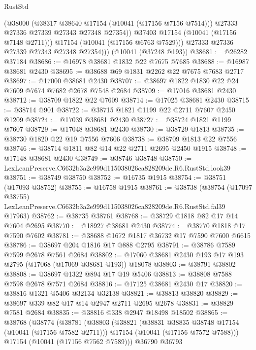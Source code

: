 \begin{lexlean}{RustStd}
\begin{coremodule}
                (@38000
                  (@38317 @38640 @17154 (@10041 (@17156 @7156 @7514)))
                  @27333
                  @27336
                  @27339
                  @27343
                  @27348
                  @27354))
              @37403
              @17154
              (@10041 (@17156 @7148 @2711)))
            @17154
            (@10041 (@17156 @6763 @7529)))
          @27333
          @27336
          @27339
          @27343
          @27348
          @27354)))
    (@10041 (@37248 @193))
@38681 := @26282 @37184
@38686 := @16978 @38681 @1832 @22 @7675 @7685
@38688 := @16987 @38681 @2430
@38695 := @38688 @69 @1831 @2262 @22 @7675 @7683 @2717
@38697 := @17000 @38681 @2430
@38707 := @38697 @1822 @1830 @22 @24 @7609 @7674 @7682 @2678 @7548 @2684
@38709 := @17016 @38681 @2430
@38712 := @38709 @1822 @22 @7609
@38714 := @17025 @38681 @2430
@38715 := @38714 @901
@38722 := @38715 @1821 @1199 @22 @2711 @7607 @2450 @1209
@38724 := @17039 @38681 @2430
@38727 := @38724 @1821 @1199 @7607
@38729 := @17048 @38681 @2430
@38730 := @38729 @1813
@38735 := @38730 @1820 @22 @19 @7556 @7606
@38738 := @38709 @1813 @22 @7556
@38746 := @38714 @1811 @82 @14 @22 @2711 @2695 @2450 @1915
@38748 := @17148 @38681 @2430
@38749 := @38746 @38748
@38750 := LexLeanPreserve.C6632b3a2e999d115038026ca828209de.R6.RustStd.look39
@38751 := @38749 @38750
@38752 := @16735 @1915
@38754 := @38751 (@17093 @38752)
@38755 := @16758 @1915
@38761 := @38738
    (@38754
      (@17097 @38755)
      LexLeanPreserve.C6632b3a2e999d115038026ca828209de.R6.RustStd.fal39
      @17963)
@38762 := @38735 @38761
@38768 := @38729 @1818 @82 @17 @14 @7604 @2695
@38770 := @18927 @38681 @2430
@38774 := @38770 @1818 @17 @7590 @7602
@38781 := @38688 @1672 @1817 @36732 @17 @7590 @7600 @6615
@38786 := @38697 @204 @1816 @17 @888 @2795
@38791 := @38786 @7589 @7599 @2678 @7561 @2684
@38802 := @17060 @38681 @2430 @193 @17 @193 @2795 (@17068 (@17069 @38681 @193)) @18078
@38803 := @38791 @38802
@38808 := @38697 @1322 @894 @17 @19 @5406
@38813 := @38808 @7588 @7598 @2678 @7571 @2684
@38816 := @17125 @38681 @2430 @17
@38820 := @38816 @1321 @5406 @32134 @32138
@38821 := @38813 @38820
@38829 := @38697 @339 @82 @17 @14 @2947 @2711 @2695 @2678
@38831 := @38829 @7581 @2684
@38835 := @38816 @338 @2947 @18498 @18502
@38865 := @38768
    (@38774
      (@38781
        (@38803
          (@38821
            (@38831 @38835 @38748 @17154 (@10041 (@17156 @7582 @2711)))
            @17154
            (@10041 (@17156 @7572 @7588)))
          @17154
          (@10041 (@17156 @7562 @7589)))
        @36790
        @36793

\end{coremodule}
\end{lexlean}
